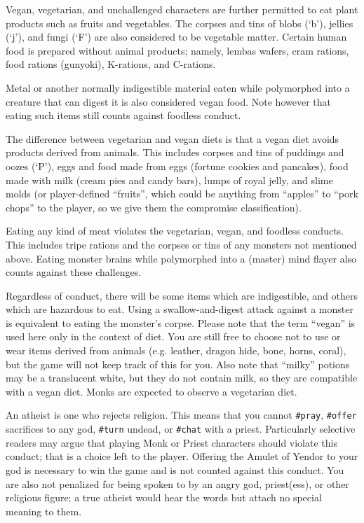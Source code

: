 Vegan, vegetarian, and unchallenged characters are further permitted
to eat plant products such as fruits and vegetables.
The corpses and tins of blobs (`b'), jellies (`j'), and fungi (`F')
are also considered to be vegetable matter.  Certain human
food is prepared without animal products; namely, lembas wafers, cram
rations, food rations (gunyoki), K-rations, and C-rations.

Metal or another normally indigestible material eaten while polymorphed
into a creature that can digest it is also considered vegan food.
Note however that eating such items still counts against foodless conduct.

The difference between vegetarian and vegan diets is that a vegan
diet avoids products derived from animals.  This includes corpses and
tins of puddings and oozes (`P'), eggs and food made from eggs (fortune
cookies and pancakes), food made with milk (cream pies and candy bars),
lumps of royal jelly, and slime molds (or player-defined ``fruits'',
which could be anything from ``apples'' to ``pork chops'' to the player,
so we give them the compromise classification).

Eating any kind of meat violates the vegetarian, vegan, and foodless
conducts.  This includes tripe rations and the corpses or tins of any
monsters not mentioned above.  Eating monster brains while polymorphed
into a (master) mind flayer also counts against these challenges.

Regardless of conduct, there will be some items which are indigestible,
and others which are hazardous to eat.  Using a swallow-and-digest
attack against a monster is equivalent to eating the monster's corpse.
Please note that the term ``vegan'' is used here only in the context of
diet.  You are still free to choose not to use or wear items derived
from animals (e.g. leather, dragon hide, bone, horns, coral), but the
game will not keep track of this for you.  Also note that ``milky''
potions may be a translucent white, but they do not contain milk,
so they are compatible with a vegan diet.
Monks are expected to observe a vegetarian diet.

An atheist is one who rejects religion.  This means that you cannot
{\tt \#pray}, {\tt \#offer} sacrifices to any god,
{\tt \#turn} undead, or {\tt \#chat} with a priest.
Particularly selective readers may argue that playing Monk or Priest
characters should violate this conduct; that is a choice left to the
player.  Offering the Amulet of Yendor to your god is necessary to
win the game and is not counted against this conduct.  You are also
not penalized for being spoken to by an angry god, priest(ess), or
other religious figure; a true atheist would hear the words but
attach no special meaning to them.

